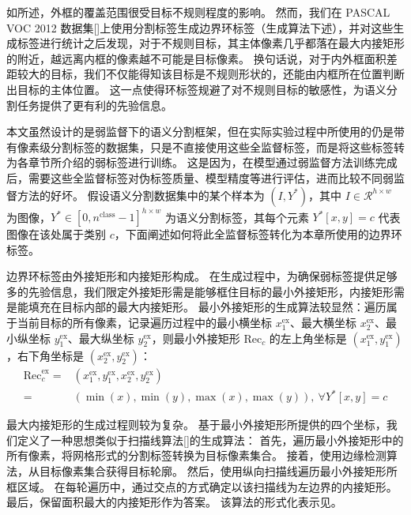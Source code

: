 如所述，外框的覆盖范围很受目标不规则程度的影响。
然而，我们在 PASCAL VOC 2012 数据集[]上使用分割标签生成边界环标签（生成算法下述），并对这些生成标签进行统计之后发现，对于不规则目标，其主体像素几乎都落在最大内接矩形的附近，越远离内框的像素越不可能是目标像素。
换句话说，对于内外框面积差距较大的目标，我们不仅能得知该目标是不规则形状的，还能由内框所在位置判断出目标的主体位置。
这一点使得环标签规避了对不规则目标的敏感性，为语义分割任务提供了更有利的先验信息。
\par
本文虽然设计的是弱监督下的语义分割框架，但在实际实验过程中所使用的仍是带有像素级分割标签的数据集，只是不直接使用这些全监督标签，而是将这些标签转为各章节所介绍的弱标签进行训练。
这是因为，在模型通过弱监督方法训练完成后，需要这些全监督标签对伪标签质量、模型精度等进行评估，进而比较不同弱监督方法的好坏。
假设语义分割数据集中的某个样本为 $(I, Y^{*})$，其中 $I \in \mathcal{R}^{h \times w}$ 为图像，$Y^{*} \in [0, n^\text{class}-1]^{h \times w}$ 为语义分割标签，其每个元素 $Y^{*}[x,y] = c$ 代表图像在该处属于类别 $c$，下面阐述如何将此全监督标签转化为本章所使用的边界环标签。
\par
边界环标签由外接矩形和内接矩形构成。
在生成过程中，为确保弱标签提供足够多的先验信息，我们限定外接矩形需是能够框住目标的最小外接矩形，内接矩形需是能填充在目标内部的最大内接矩形。
最小外接矩形的生成算法较显然：遍历属于当前目标的所有像素，记录遍历过程中的最小横坐标 $x_1^\text{ex}$、最大横坐标 $x_2^\text{ex}$、最小纵坐标 $y_1^\text{ex}$、最大纵坐标 $y_2^\text{ex}$，则最小外接矩形 $\text{Rec}_c$ 的左上角坐标是 $(x_1^\text{ex}, y_1^\text{ex})$，右下角坐标是 $(x_2^\text{ex}, y_2^\text{ex})$：
\begin{equation}
\begin{split}
  \text{Rec}^\text{ex}_c = &(x_1^\text{ex}, y_1^\text{ex}, x_2^\text{ex}, y_2^\text{ex})\\
= &(\min(x), \min(y), \max(x), \max(y)),\ \forall Y^{*}[x,y] = c    
\end{split}
\end{equation}
\par
最大内接矩形的生成过程则较为复杂。
基于最小外接矩形所提供的四个坐标，我们定义了一种思想类似于扫描线算法[]的生成算法：
首先，遍历最小外接矩形中的所有像素，将网格形式的分割标签转换为目标像素集合。
接着，使用边缘检测算法，从目标像素集合获得目标轮廓。
然后，使用纵向扫描线遍历最小外接矩形所框区域。
在每轮遍历中，通过交点的方式确定以该扫描线为左边界的内接矩形。
最后，保留面积最大的内接矩形作为答案。
该算法的形式化表示见。
